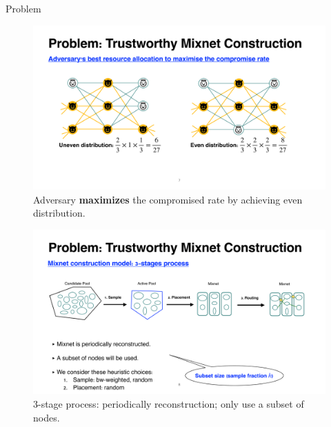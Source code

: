 \documentclass[final]{beamer}
\newlength{\leftcolwidth}
\newlength{\rightcolwidth}
\begin{document}
\begin{frame}[t]
\begin{columns}[t]
\begin{column}{\leftcolwidth}
\begin{block}{Problem}
  \vspace{-1cm}

    \begin{figure}
    \includegraphics[width=\rightcolwidth]{images/problem_max.pdf}
    \caption{Adversary \textbf{maximizes} the compromised rate by achieving even distribution.}
  \end{figure}
  
  \vspace{1.5cm}
    \begin{figure}
    \includegraphics[width=\rightcolwidth]{images/problem_model.pdf}
    \caption{3-stage process: periodically reconstruction; only use a subset of nodes.}
  \end{figure}
  

\end{block}
\end{column}
\end{columns}
\end{frame}
\end{document}
